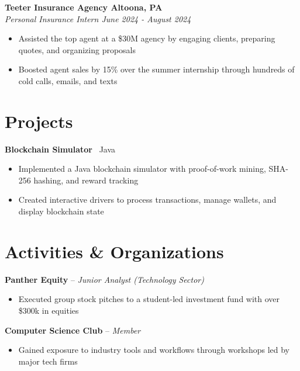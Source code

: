 \documentclass[11pt]{article}
\begin{document}
\vspace{0.1em}

\begin{adjustwidth}{0.5em}{0em}
\textbf{Teeter Insurance Agency \hfill Altoona, PA} \\
\textit{Personal Insurance Intern \hfill June 2024 - August 2024} 
\begin{itemize}[leftmargin=1.5em, itemsep=0em, topsep=0.2em]
    \item Assisted the top agent at a \$30M agency by engaging clients, preparing quotes, and organizing proposals
    \item Boosted agent sales by 15\% over the summer internship through hundreds of cold calls, emails, and texts  
\end{itemize} 
\end{adjustwidth}


\section*{Projects}
\begin{adjustwidth}{0.5em}{0em}

\textbf{Blockchain Simulator} \textbar\ Java
\begin{itemize}[leftmargin=2em, itemsep=0pt, topsep=1.5pt]
    \item Implemented a Java blockchain simulator with proof-of-work mining, SHA-256 hashing, and reward tracking
    \item Created interactive drivers to process transactions, manage wallets, and display blockchain state
\end{itemize} 
\end{adjustwidth}

\section*{Activities \& Organizations}
\begin{adjustwidth}{0.5em}{0em}
\textbf{Panther Equity} -- \textit{Junior Analyst (Technology Sector)} 
\begin{itemize}[leftmargin=1.5em, itemsep=0em, topsep=0.2em]
    \item Executed group stock pitches to a student-led investment fund with over \$300k in equities
\end{itemize}
\end{adjustwidth}

\vspace{0.1em}
\begin{adjustwidth}{0.5em}{0em}
\textbf{Computer Science Club} -- \textit{Member}
\begin{itemize}[leftmargin=1.5em, itemsep=0em, topsep=0.2em]
    \item Gained exposure to industry tools and workflows through workshops led by major tech firms
\end{itemize}
\end{adjustwidth}
\end{document}
